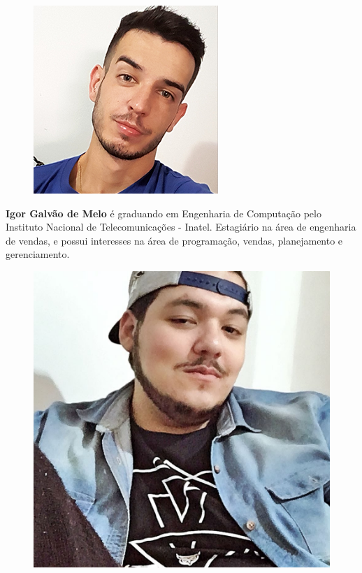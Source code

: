 \begin{figure}
\includegraphics[width=\linewidth]{figuras/autor_igor.png}
\end{figure}

\textbf{Igor Galvão de Melo} é graduando em Engenharia de Computação pelo Instituto Nacional de Telecomunicações - Inatel. Estagiário na área de engenharia de vendas, e possui interesses na área de programação, vendas, planejamento e gerenciamento.\newline

\begin{figure}
\includegraphics[width=\linewidth]{figuras/autor_lucas.jpg}
\end{figure}

